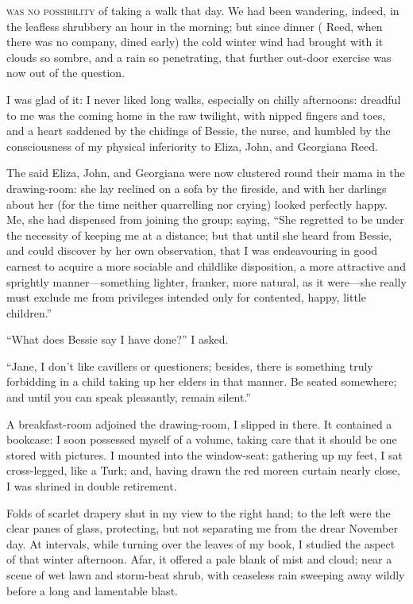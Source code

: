 
 \textsc{was no possibility} of taking a walk that day. We had been
wandering, indeed, in the leafless shrubbery an hour in the morning; but
since dinner (\Mrs{} Reed, when there was no company, dined early) the
cold winter wind had brought with it clouds so sombre, and a rain so
penetrating, that further out-door exercise was now out of the question.

I was glad of it: I never liked long walks, especially on chilly
afternoons: dreadful to me was the coming home in the raw twilight, with
nipped fingers and toes, and a heart saddened by the chidings of Bessie,
the nurse, and humbled by the consciousness of my physical inferiority
to Eliza, John, and Georgiana Reed.

The said Eliza, John, and Georgiana were now clustered round their mama
in the drawing-room: she lay reclined on a sofa by the fireside, and
with her darlings about her (for the time neither quarrelling nor
crying) looked perfectly happy. Me, she had dispensed from joining the
group; saying, \enquote{She regretted to be under the necessity of
	keeping me at a distance; but that until she heard from Bessie, and
	could discover by her own observation, that I was endeavouring in good
	earnest to acquire a more sociable and childlike disposition, a more
	attractive and sprightly manner---something lighter, franker, more
	natural, as it were---she really must exclude me from privileges
	intended only for contented, happy, little children.}

\enquote{What does Bessie say I have done?} I asked.

\enquote{Jane, I don't like cavillers or questioners; besides, there is
	something truly forbidding in a child taking up her elders in that
	manner. Be seated somewhere; and until you can speak pleasantly, remain
	silent.}

A breakfast-room adjoined the drawing-room, I slipped in there. It
contained a bookcase: I soon possessed myself of a volume, taking care
that it should be one stored with pictures. I mounted into the
window-seat: gathering up my feet, I sat cross-legged, like a Turk; and,
having drawn the red moreen curtain nearly close, I was shrined in
double retirement.

Folds of scarlet drapery shut in my view to the right hand; to the left
were the clear panes of glass, protecting, but not separating me from
the drear November day. At intervals, while turning over the leaves of
my book, I studied the aspect of that winter afternoon. Afar, it
offered a pale blank of mist and cloud; near a scene of wet lawn and
storm-beat shrub, with ceaseless rain sweeping away wildly before a long
and lamentable blast.

